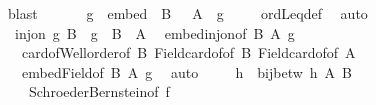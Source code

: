 \begin{isabellebody}
\ blast\isanewline
\ \ \ \isamarkupfalse%
\ \isamarkupfalse%
\ g\ \ {\isachardoublequoteopen}embed\ {\isacharparenleft}{\kern0pt}\ {\isacharbar}{\kern0pt}B{\isacharbar}{\kern0pt}\ {\isacharparenright}{\kern0pt}\ {\isacharparenleft}{\kern0pt}\ {\isacharbar}{\kern0pt}A{\isacharbar}{\kern0pt}\ {\isacharparenright}{\kern0pt}\ g{\isachardoublequoteclose}\isanewline
\ \ \ \isamarkupfalse%
\ ordLeq{\isacharunderscore}{\kern0pt}def\ \isamarkupfalse%
\ auto\isanewline
\ \ \ \isamarkupfalse%
\ {}{\isacharcolon}{\kern0pt}\ {\isachardoublequoteopen}inj{\isacharunderscore}{\kern0pt}on\ g\ B\ {\isasymand}\ g\ {\isacharbackquote}{\kern0pt}\ B\ {\isasymle}\ A{\isachardoublequoteclose}\ \isamarkupfalse%
\ embed{\isacharunderscore}{\kern0pt}inj{\isacharunderscore}{\kern0pt}on{\isacharbrackleft}{\kern0pt}of\ {\isachardoublequoteopen}{\isacharbar}{\kern0pt}B{\isacharbar}{\kern0pt}{\isachardoublequoteclose}\ {\isachardoublequoteopen}{\isacharbar}{\kern0pt}A{\isacharbar}{\kern0pt}{\isachardoublequoteclose}\ {\isachardoublequoteopen}g{\isachardoublequoteclose}{\isacharbrackright}{\kern0pt}\isanewline
\ \ \ card{\isacharunderscore}{\kern0pt}of{\isacharunderscore}{\kern0pt}Well{\isacharunderscore}{\kern0pt}order{\isacharbrackleft}{\kern0pt}of\ {\isachardoublequoteopen}B{\isachardoublequoteclose}{\isacharbrackright}{\kern0pt}\ Field{\isacharunderscore}{\kern0pt}card{\isacharunderscore}{\kern0pt}of{\isacharbrackleft}{\kern0pt}of\ {\isachardoublequoteopen}B{\isachardoublequoteclose}{\isacharbrackright}{\kern0pt}\ Field{\isacharunderscore}{\kern0pt}card{\isacharunderscore}{\kern0pt}of{\isacharbrackleft}{\kern0pt}of\ {\isachardoublequoteopen}A{\isachardoublequoteclose}{\isacharbrackright}{\kern0pt}\isanewline
\ \ \ embed{\isacharunderscore}{\kern0pt}Field{\isacharbrackleft}{\kern0pt}of\ {\isachardoublequoteopen}{\isacharbar}{\kern0pt}B{\isacharbar}{\kern0pt}{\isachardoublequoteclose}\ {\isachardoublequoteopen}{\isacharbar}{\kern0pt}A{\isacharbar}{\kern0pt}{\isachardoublequoteclose}\ g{\isacharbrackright}{\kern0pt}\ \isamarkupfalse%
\ auto\isanewline
\ \ \ \isamarkupfalse%
\ h\ \ {\isachardoublequoteopen}bij{\isacharunderscore}{\kern0pt}betw\ h\ A\ B{\isachardoublequoteclose}\isanewline
\ \ \ \isamarkupfalse%
\ {\isacharasterisk}{\kern0pt}\ {\isacharasterisk}{\kern0pt}{\isacharasterisk}{\kern0pt}\ {}\ Schroeder{\isacharunderscore}{\kern0pt}Bernstein{\isacharbrackleft}{\kern0pt}of\ f{\isacharbrackright}{\kern0pt}\ \isamarkupfalse%

\end{isabellebody}
